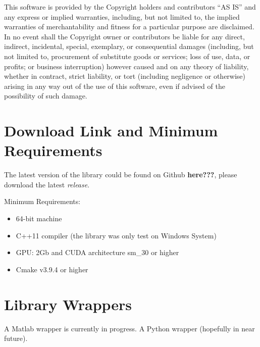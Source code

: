 \documentclass[12pt,letterpaper]{article}
\begin{document}
    This software is provided by the Copyright holders and contributors
    ``AS IS'' and any express or implied warranties, including, but not
    limited to, the implied warranties of merchantability and fitness for
    a particular purpose are disclaimed. In no event shall the Copyright
    owner or contributors be liable for any direct, indirect, incidental,
    special, exemplary, or consequential damages (including, but not
    limited to, procurement of substitute goods or services; loss of use,
    data, or profits; or business interruption) however caused and on any
    theory of liability, whether in contract, strict liability, or tort
    (including negligence or otherwise) arising in any way out of the use
    of this software, even if advised of the possibility of such damage.
\section{Download Link and Minimum Requirements}
The latest version of the library could be found on Github \textbf{here???}, please download the latest {\em release}.

\noindent Minimum Requirements:
\begin{itemize}
\item 64-bit machine
\item C++11 compiler (the library was only test on Windows System)
\item GPU: 2Gb and CUDA architecture sm\_30 or higher
\item Cmake v3.9.4 or higher
\end{itemize}

\section{Library Wrappers}
A Matlab wrapper is currently in progress.
A Python wrapper (hopefully in near future).
\end{document}
